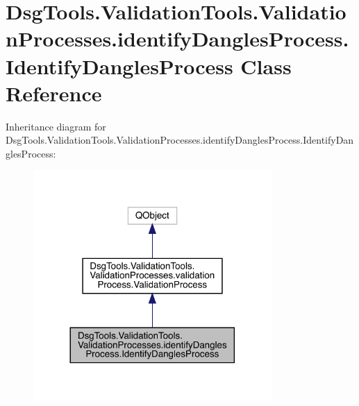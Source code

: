 \hypertarget{class_dsg_tools_1_1_validation_tools_1_1_validation_processes_1_1identify_dangles_process_1_1_identify_dangles_process}{}\section{Dsg\+Tools.\+Validation\+Tools.\+Validation\+Processes.\+identify\+Dangles\+Process.\+Identify\+Dangles\+Process Class Reference}
\label{class_dsg_tools_1_1_validation_tools_1_1_validation_processes_1_1identify_dangles_process_1_1_identify_dangles_process}


Inheritance diagram for Dsg\+Tools.\+Validation\+Tools.\+Validation\+Processes.\+identify\+Dangles\+Process.\+Identify\+Dangles\+Process\+:
\nopagebreak
\begin{figure}[H]
\begin{center}
\leavevmode
\includegraphics[width=257pt]{class_dsg_tools_1_1_validation_tools_1_1_validation_processes_1_1identify_dangles_process_1_1_id59d0ec8a7cca0f3c2737bab3faf95ec0}
\end{center}
\end{figure}


